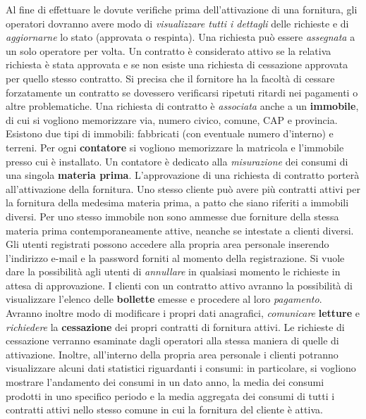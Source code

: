 \documentclass[a4paper,12pt]{report}
\begin{document}
\begin{mdframed}
\newline
Al fine di effettuare le dovute verifiche prima dell'attivazione di una fornitura, gli operatori dovranno avere modo di \textit{visualizzare tutti i dettagli} delle richieste e di \textit{aggiornarne} lo stato (approvata o respinta). Una richiesta può essere \textit{assegnata} a un solo operatore per volta. Un contratto è considerato attivo se la relativa richiesta è stata approvata e se non esiste una richiesta di cessazione approvata per quello stesso contratto. Si precisa che il fornitore ha la facoltà di cessare forzatamente un contratto se dovessero verificarsi ripetuti ritardi nei pagamenti o altre problematiche.
\newline
Una richiesta di contratto è \textit{associata} anche a un \textbf{immobile}, di cui si vogliono memorizzare via, numero civico, comune, CAP e provincia. Esistono due tipi di immobili: fabbricati (con eventuale numero d'interno) e terreni.
\newline
Per ogni \textbf{contatore} si vogliono memorizzare la matricola e l'immobile presso cui è installato. Un contatore è dedicato alla \textit{misurazione} dei consumi di una singola \textbf{materia prima}.
\newline
L'approvazione di una richiesta di contratto porterà all'attivazione della fornitura. Uno stesso cliente può avere più contratti attivi per la fornitura della medesima materia prima, a patto che siano riferiti a immobili diversi. Per uno stesso immobile non sono ammesse due forniture della stessa materia prima contemporaneamente attive, neanche se intestate a clienti diversi.
\newline
Gli utenti registrati possono accedere alla propria area personale inserendo l'indirizzo e-mail e la password forniti al momento della registrazione. Si vuole dare la possibilità agli utenti di \textit{annullare} in qualsiasi momento le richieste in attesa di approvazione. I clienti con un contratto attivo avranno la possibilità di visualizzare l'elenco delle \textbf{bollette} emesse e procedere al loro \textit{pagamento}. Avranno inoltre modo di modificare i propri dati anagrafici, \textit{comunicare} \textbf{letture} e \textit{richiedere} la \textbf{cessazione} dei propri contratti di fornitura attivi. Le richieste di cessazione verranno esaminate dagli operatori alla stessa maniera di quelle di attivazione.
\newline
Inoltre, all'interno della propria area personale i clienti potranno visualizzare alcuni dati statistici riguardanti i consumi: in particolare, si vogliono mostrare l'andamento dei consumi in un dato anno, la media dei consumi prodotti in uno specifico periodo e la media aggregata dei consumi di tutti i contratti attivi nello stesso comune in cui la fornitura del cliente è attiva.

\end{mdframed}
\end{document}
